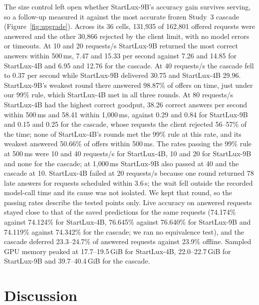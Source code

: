 \documentclass[11pt]{article}
\begin{document}
The size control left open whether StartLux-9B's accuracy gain survives serving, so a follow-up measured it against the most accurate frozen Study~3 cascade (Figure~\ref{fig:upgrade}). Across its 36 cells, 131,935 of 162,801 offered requests were answered and the other 30,866 rejected by the client limit, with no model errors or timeouts. At 10 and 20 requests/s StartLux-9B returned the most correct answers within 500\,ms, 7.47 and 15.33 per second against 7.26 and 14.85 for StartLux-4B and 6.95 and 12.76 for the cascade. At 40 requests/s the cascade fell to 0.37 per second while StartLux-9B delivered 30.75 and StartLux-4B 29.96. StartLux-9B's weakest round there answered 98.87\% of offers on time, just under our 99\% rule, which StartLux-4B met in all three rounds. At 80 requests/s StartLux-4B had the highest correct goodput, 38.26 correct answers per second within 500\,ms and 58.41 within 1,000\,ms, against 0.29 and 0.84 for StartLux-9B and 0.15 and 0.25 for the cascade, whose requests the client rejected 56--57\% of the time; none of StartLux-4B's rounds met the 99\% rule at this rate, and its weakest answered 50.66\% of offers within 500\,ms. The rates passing the 99\% rule at 500\,ms were 10 and 40 requests/s for StartLux-4B, 10 and 20 for StartLux-9B and none for the cascade; at 1,000\,ms StartLux-9B also passed at 40 and the cascade at 10. StartLux-4B failed at 20 requests/s because one round returned 78 late answers for requests scheduled within 3.6\,s; the wait fell outside the recorded model-call time and its cause was not isolated. We kept that round, so the passing rates describe the tested points only. Live accuracy on answered requests stayed close to that of the saved predictions for the same requests (74.174\% against 74.124\% for StartLux-4B, 76.645\% against 76.640\% for StartLux-9B and 74.119\% against 74.342\% for the cascade; we ran no equivalence test), and the cascade deferred 23.3--24.7\% of answered requests against 23.9\% offline. Sampled GPU memory peaked at 17.7--19.5\,GiB for StartLux-4B, 22.0--22.7\,GiB for StartLux-9B and 39.7--40.4\,GiB for the cascade.

\section{Discussion}
\end{document}
